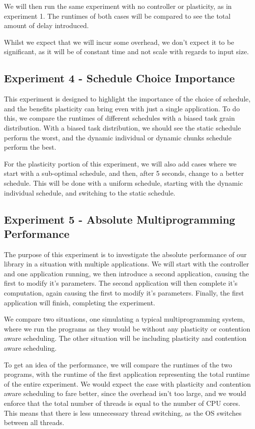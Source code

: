We will then run the same experiment with no controller or plasticity, as in experiment 1. The runtimes of both cases will be compared to see the total amount of delay introduced.

Whilst we expect that we will incur some overhead, we don't expect it to be significant, as it will be of constant time and not scale with regards to input size.





\subsection{Experiment 4 - Schedule Choice Importance}

This experiment is designed to highlight the importance of the choice of schedule, and the benefits plasticity can bring even with just a single application. To do this, we compare the runtimes of different schedules with a biased task grain distribution. With a biased task distribution, we should see the static schedule perform the worst, and the dynamic individual or dynamic chunks schedule perform the best.

For the plasticity portion of this experiment, we will also add cases where we start with a sub-optimal schedule, and then, after 5 seconds, change to a better schedule. This will be done with a uniform schedule, starting with the dynamic individual schedule, and switching to the static schedule.





\subsection{Experiment 5 - Absolute Multiprogramming Performance}

The purpose of this experiment is to investigate the absolute performance of our library in a situation with multiple applications. We will start with the controller and one application running, we then introduce a second application, causing the first to modify it's parameters. The second application will then complete it's computation, again causing the first to modify it's parameters. Finally, the first application will finish, completing the experiment. 

We compare two situations, one simulating a typical multiprogramming system, where we run the programs as they would be without any plasticity or contention aware scheduling. The other situation will be including plasticity and contention aware scheduling.

To get an idea of the performance, we will compare the runtimes of the two programs, with the runtime of the first application representing the total runtime of the entire experiment. We would expect the case with plasticity and contention aware scheduling to fare better, since the overhead isn't too large, and we would enforce that the total number of threads is equal to the number of CPU cores. This means that there is less unnecessary thread switching, as the OS switches between all threads.

